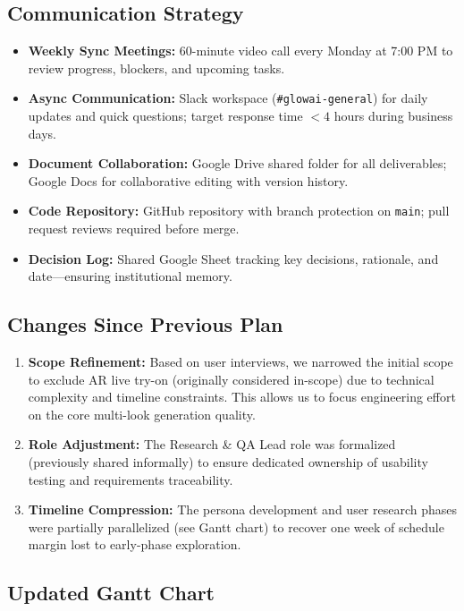 \documentclass[11pt, letterpaper]{article}
\begin{document}
\subsection{Communication Strategy}

\begin{itemize}[leftmargin=*]
    \item \textbf{Weekly Sync Meetings:} 60-minute video call every Monday at 7:00 PM to review progress, blockers, and upcoming tasks.
    \item \textbf{Async Communication:} Slack workspace (\texttt{\#glowai-general}) for daily updates and quick questions; target response time $< 4$ hours during business days.
    \item \textbf{Document Collaboration:} Google Drive shared folder for all deliverables; Google Docs for collaborative editing with version history.
    \item \textbf{Code Repository:} GitHub repository with branch protection on \texttt{main}; pull request reviews required before merge.
    \item \textbf{Decision Log:} Shared Google Sheet tracking key decisions, rationale, and date---ensuring institutional memory.
\end{itemize}

\subsection{Changes Since Previous Plan}
\begin{enumerate}[leftmargin=*]
    \item \textbf{Scope Refinement:} Based on user interviews, we narrowed the initial scope to exclude AR live try-on (originally considered in-scope) due to technical complexity and timeline constraints. This allows us to focus engineering effort on the core multi-look generation quality.
    \item \textbf{Role Adjustment:} The Research \& QA Lead role was formalized (previously shared informally) to ensure dedicated ownership of usability testing and requirements traceability.
    \item \textbf{Timeline Compression:} The persona development and user research phases were partially parallelized (see Gantt chart) to recover one week of schedule margin lost to early-phase exploration.
\end{enumerate}

\subsection{Updated Gantt Chart}
\end{document}
